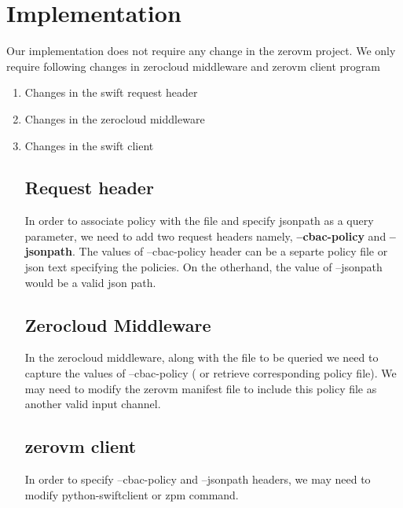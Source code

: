 \section { Implementation}

Our implementation does not require any change in the zerovm project. We only require following changes in zerocloud middleware and zerovm client program

\begin{enumerate}
\item Changes in the swift request header
\item Changes in the zerocloud middleware
\item Changes in the swift client


\subsection{Request header}
In order to associate policy with the file and specify jsonpath as a query parameter, we need to add two request headers namely, \textbf{--cbac-policy} and \textbf{--jsonpath}.  The values of --cbac-policy header can be a separte policy file or  json text specifying the policies. On the otherhand, the value of --jsonpath would be a valid json path. 

\subsection{Zerocloud Middleware}
In the zerocloud middleware, along with the file to be queried we  need to capture the values of --cbac-policy ( or retrieve corresponding policy file). We may need to modify the zerovm manifest file to include this policy file as another valid input channel. 

\subsection{zerovm client}

In order to specify --cbac-policy and --jsonpath headers, we may need to modify python-swiftclient or zpm command.

\end{enumerate}